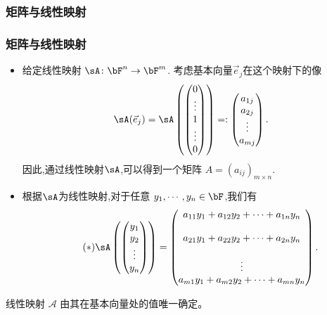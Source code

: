 \subsubsection{矩阵与线性映射}
\begin{frame}\frametitle{矩阵与线性映射}
\begin{itemize}
\item 给定线性映射 $\sA\colon \bF^n\rightarrow \bF^m$. 考虑基本向量$\vec{e}_j$在这个映射下的像
\[\sA(\vec{e}_j)=\sA\left(\begin{pmatrix}0\\\vdots\\1\\\vdots\\0\end{pmatrix}\right)=:\begin{pmatrix}a_{1j}\\a_{2j}\\\vdots\\a_{mj}\end{pmatrix}.\]
\pp
因此,通过线性映射$\sA$,可以得到一个矩阵 $A=(a_{ij})_{m\times n}$.
\pp
\bigskip

\item 根据$\sA$为线性映射,对于任意 $y_1,\cdots,y_n\in \bF$,我们有
\begin{equation}\label{equ:linearmap} \tag{$*$}
\sA\left(\begin{pmatrix}y_1\\y_2\\\vdots\\y_n\end{pmatrix}\right)
=\begin{pmatrix} a_{11}y_1+a_{12}y_2+\cdots+a_{1n}y_n\\ \\ a_{21}y_1+a_{22}y_2+\cdots+a_{2n}y_n\\ \\ \vdots\\ a_{m1}y_1+a_{m2}y_2+\cdots+a_{mn}y_n\end{pmatrix}.
\end{equation}


\end{itemize}

\pp
\bigskip

 线性映射 $\mathscr{A}$ 由其在基本向量处的值唯一确定。

\end{frame}





